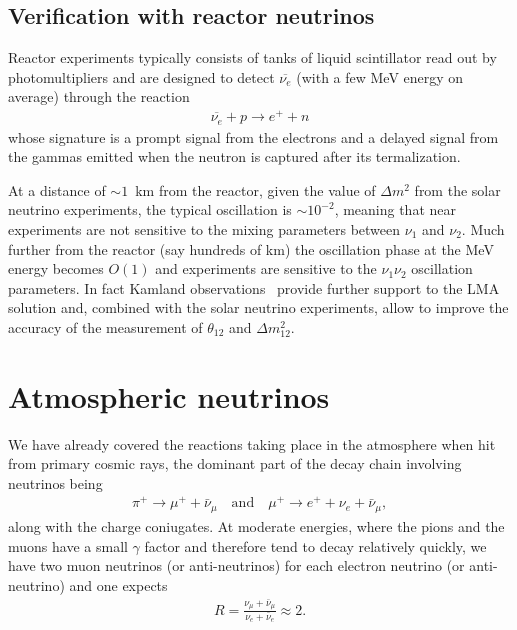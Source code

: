 \subsection{Verification with reactor neutrinos}

Reactor experiments typically consists of tanks of liquid scintillator read out by
photomultipliers and are designed to detect $\overline{\nu_e}$ (with a few MeV energy
on average) through the reaction
\begin{align*}
  \overline{\nu_e} + p \rightarrow e^+ + n
\end{align*}
whose signature is a prompt signal from the electrons and a delayed signal from
the gammas emitted when the neutron is captured after its termalization.

At a distance of $\sim 1$~km from the reactor, given the value of $\Delta m^2$ from
the solar neutrino experiments, the typical oscillation is $\sim 10^{-2}$, meaning
that near experiments are not sensitive to the mixing parameters between $\nu_1$
and $\nu_2$.  Much further from the reactor (say hundreds of km) the oscillation phase
at the MeV energy becomes $O(1)$ and experiments are sensitive to the $\nu_1\nu_2$
oscillation parameters. In fact Kamland observations~\cite{2005PhRvL..94h1801A} provide
further support to the LMA solution and, combined with the solar neutrino experiments,
allow to improve the accuracy of the measurement of $\theta_{12}$ and $\Delta m^2_{12}$.


\section{Atmospheric neutrinos}

We have already covered the reactions taking place in the atmosphere when hit from
primary cosmic rays, the dominant part of the decay chain involving neutrinos being
\begin{align*}
  \pi^+ \rightarrow \mu^+ + \bar{\nu}_\mu
  \quad\text{and}\quad
  \mu^+ \rightarrow e^+ + \nu_e + \bar{\nu}_\mu,
\end{align*}
along with the charge coniugates. At moderate energies, where the pions and the
muons have a small $\gamma$ factor and therefore tend to decay relatively quickly,
we have two muon neutrinos (or anti-neutrinos) for each electron neutrino (or anti-neutrino)
and one expects
\begin{align*}
  R = \frac{\nu_\mu + \bar{\nu}_\mu}{\nu_e + \bar{\nu}_e} \approx 2.
\end{align*}

